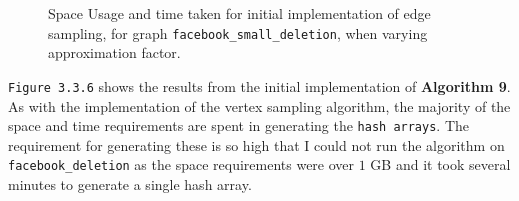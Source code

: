\documentclass[11pt,twoside,a4paper]{report}
\begin{document}
\begin{figure}[H]
	\label{Figure 18}
	\caption{Space Usage and time taken for initial implementation of edge sampling, for graph \texttt{facebook\_small\_deletion}, when varying approximation factor.}
\end{figure}

\texttt{Figure 3.3.6} shows the results from the initial implementation of \textbf{Algorithm 9}. As with the implementation of the vertex sampling algorithm, the majority of the space and time requirements are spent in generating the \texttt{hash arrays}. The requirement for generating these is so high that I could not run the algorithm on \texttt{facebook\_deletion} as the space requirements were over $1$ GB and it took several minutes to generate a single hash array.
\end{document}
